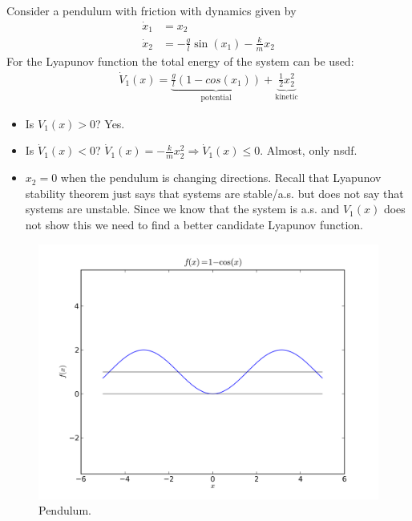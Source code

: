 \begin{example}
Consider a pendulum with friction with dynamics given by
\begin{align*}
\dot{x}_1 &= x_2 \\
\dot{x}_2 &= -\tfrac{g}{l}\sin(x_1) - \tfrac{k}{m}x_2
\end{align*}
For the Lyapunov function the total energy of the system can be used:
\begin{align*}
\dot{V}_1(x) = \underbrace{\tfrac{g}{l}(1-cos(x_1))}_{\text{potential}} + \underbrace{\tfrac{1}{2}x_2^2}_{\text{kinetic}}
\end{align*}
\begin{itemize}
\item Is $V_1(x)>0$? Yes.
\item Is $\dot{V}_1(x)<0$? $\dot{V}_1(x) = -\tfrac{k}{m}x_2^2 \Rightarrow \dot{V}_1(x)\leq0$. Almost, only nsdf.
\item $x_2=0$ when the pendulum is changing directions. Recall that Lyapunov stability theorem just says that systems are stable/a.s. but does not say that systems are unstable. Since we know that the system is a.s. and $V_1(x)$ does not show this we need to find a better candidate Lyapunov function.
\end{itemize}

\begin{figure}[ht!]
	\centering
	\includegraphics[width=.5\textwidth]{images/plot1minusCosX}
	\caption{Pendulum.}
	\label{fig:plot1minusCosX}
\end{figure}


\end{example}

